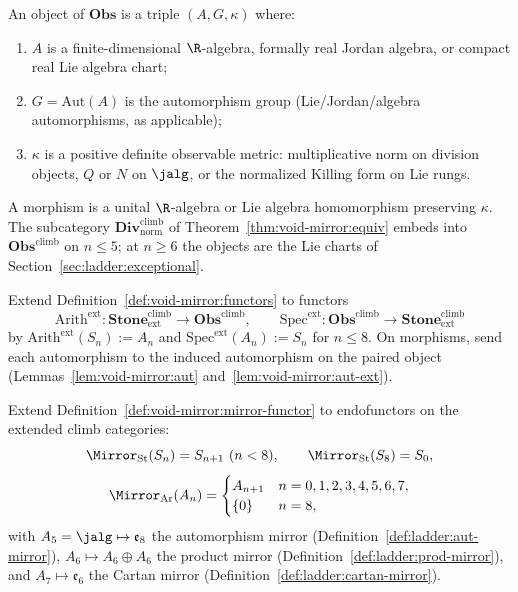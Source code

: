 \begin{definition}\label{def:void-mirror:Obs}
An object of $\mathbf{Obs}$ is a triple $(A,G,\kappa)$ where:
\begin{enumerate}[label=(\roman*),leftmargin=*]
  \item $A$ is a finite-dimensional $\R$-algebra, formally real Jordan algebra,
    or compact real Lie algebra chart;
  \item $G=\mathrm{Aut}(A)$ is the automorphism group (Lie/Jordan/algebra
    automorphisms, as applicable);
  \item $\kappa$ is a positive definite observable metric: multiplicative norm
    on division objects, $Q$ or $N$ on $\jalg$, or the normalized Killing
    form on Lie rungs.
\end{enumerate}
A morphism is a unital $\R$-algebra or Lie algebra homomorphism preserving
$\kappa$. The subcategory $\mathbf{Div}^{\mathrm{climb}}_{\mathrm{norm}}$
of Theorem~\ref{thm:void-mirror:equiv} embeds into $\mathbf{Obs}^{\mathrm{climb}}$
on $n\leq5$; at $n\geq6$ the objects are the Lie charts of
Section~\ref{sec:ladder:exceptional}.
\end{definition}

\begin{definition}\label{def:void-mirror:functors-ext}
Extend Definition~\ref{def:void-mirror:functors} to functors
\[
  \mathrm{Arith}^{\mathrm{ext}}:
  \mathbf{Stone}^{\mathrm{climb}}_{\mathrm{ext}}\longrightarrow
  \mathbf{Obs}^{\mathrm{climb}},
  \qquad
  \mathrm{Spec}^{\mathrm{ext}}:
  \mathbf{Obs}^{\mathrm{climb}}\longrightarrow
  \mathbf{Stone}^{\mathrm{climb}}_{\mathrm{ext}}
\]
by $\mathrm{Arith}^{\mathrm{ext}}(S_n):=A_n$ and
$\mathrm{Spec}^{\mathrm{ext}}(A_n):=S_n$ for $n\leq8$. On morphisms, send each
automorphism to the induced automorphism on the paired object
(Lemmas~\ref{lem:void-mirror:aut} and~\ref{lem:void-mirror:aut-ext}).
\end{definition}

\begin{definition}\label{def:void-mirror:mirror-functor-ext}
Extend Definition~\ref{def:void-mirror:mirror-functor} to endofunctors on the
extended climb categories:
\[
  \Mirror_{\mathrm{St}}(S_n)=S_{n+1}\ (n<8),\qquad
  \Mirror_{\mathrm{St}}(S_8)=S_0,
\]
\[
  \Mirror_{\mathrm{Ar}}(A_n)=
  \begin{cases}
    A_{n+1} & n=0,1,2,3,4,5,6,7,\\
    \{0\} & n=8,
  \end{cases}
\]
with $A_5=\jalg\mapsto\mathfrak{e}_8$ the automorphism mirror
(Definition~\ref{def:ladder:aut-mirror}),
$A_6\mapsto A_6\oplus A_6$ the product mirror
(Definition~\ref{def:ladder:prod-mirror}), and
$A_7\mapsto\mathfrak{e}_6$ the Cartan mirror
(Definition~\ref{def:ladder:cartan-mirror}).
\end{definition}


